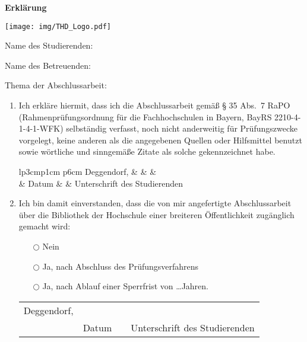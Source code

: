\thispagestyle{empty}
\newcommand{\signature}[1]{%
\bigskip
\noindent
\begin{tabular*}{\linewidth}{lp{3cm}p{1cm} p{6cm}}
Deggendorf, & \dotfill & & \dotfill \\
& {\footnotesize Datum} & & {\centering \footnotesize #1}
\end{tabular*}
}

\begin{minipage}[b]{.5\linewidth}
	\Large\textbf{Erklärung}
\end{minipage}
\begin{minipage}[b]{.5\linewidth}
	\texttt{[image: img/THD\_Logo.pdf]}
\end{minipage}

\bigskip

Name des Studierenden: \quad \student

\bigskip
Name des Betreuenden: \quad \supervisor

\vspace{.7cm}
Thema der Abschlussarbeit:

\vspace{.5em}
{\def\\{\relax\ifhmode\unskip\fi\space\ignorespaces}
\thesistitleDE
}\dotfill

\vspace{.5em}
\dotfill

\vspace{.5em}
\dotfill

\vspace{.5em}
\dotfill

\begin{enumerate}
	\item Ich erkläre hiermit, dass ich die Abschlussarbeit gemäß § 35 Abs.~7 RaPO (Rahmen\-prüf\-ungs\-ordnung für die Fachhochschulen in Bayern, BayRS 2210-4-1-4-1-WFK)  selbständig  verfasst,  noch  nicht  anderweitig  für Prüfungszwecke  vorgelegt,  keine  anderen  als  die  angegebenen  Quellen  oder Hilfsmittel  benutzt  sowie  wörtliche  und  sinngemäße  Zitate  als  solche gekenn\-zeichnet habe.

		\signature{Unterschrift des Studierenden}

	\item  Ich  bin  damit  einverstanden, dass die von  mir angefertigte  Abschlussarbeit über die Bibliothek der Hochschule einer breiteren Öffentlichkeit zugänglich gemacht wird:
		\begin{itemize}
			\item[$\bigcirc$] Nein
			\item[$\bigcirc$] Ja, nach Abschluss des Prüfungsverfahrens
			\item[$\bigcirc$] Ja, nach Ablauf einer Sperrfrist von \ldots Jahren.
		\end{itemize}

		\signature{Unterschrift des Studierenden}
\end{enumerate}

